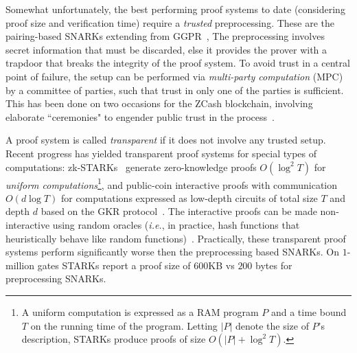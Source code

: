Somewhat unfortunately, the best performing proof systems to date (considering proof size and verification time) require a \emph{trusted} preprocessing. These are the pairing-based SNARKs extending from GGPR~\cite{EC:GGPR13,ES:SBVBPW13,SP:PHGR13,TCC:BCIOP13,C:BCGTV13,USENIX:BCTV14,EC:Groth16}, 
The preprocessing involves secret information that must be discarded, else it provides the prover with a trapdoor that breaks the integrity of the proof system. To avoid trust in a central point of failure, the setup can be performed via \emph{multi-party computation} (MPC) by a committee of parties, such that trust in only one of the parties is sufficient. This has been done on two occasions for the ZCash blockchain, involving elaborate ``ceremonies" to engender public trust in the process~\cite{ZcashCeremony}. 

A proof system is called \emph{transparent} if it does not involve any trusted setup. Recent progress has yielded transparent proof systems for special types of computations: zk-STARKs~\cite{C:BBHR19} generate zero-knowledge proofs $O(\log^2 T)$ for \emph{uniform computations}\footnote{A uniform computation is expressed as a RAM program $P$ and a time bound $T$ on the running time of the program. Letting $|P|$ denote the size of $P$'s description, STARKs produce proofs of size $O(|P| + \log^2 T)$.}, and public-coin interactive proofs with communication $O(d \log T)$ for computations expressed as low-depth circuits of total size $T$ and depth $d$ based on the GKR protocol~\cite{STOC:GolKalRot08}. The interactive proofs can be made non-interactive using random oracles (\emph{i.e.}, in practice, hash functions that heuristically behave like random functions)~\cite{C:FiaSha86,STOC:CCHLRRW19}.
Practically, these transparent proof systems perform significantly worse then the preprocessing based SNARKs. On $1$-million gates STARKs \cite{C:BBHR19} report a proof size of $600$KB vs $200$ bytes for preprocessing SNARKs. 

